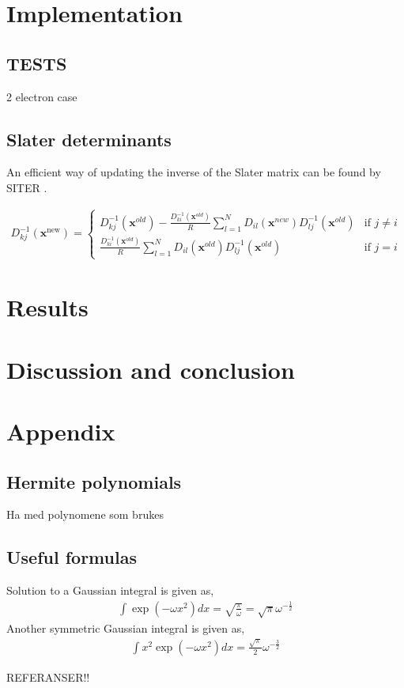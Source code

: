 \documentclass[11pt]{article}
\newcommand{\husk}[1]{\color{red} #1 \color{black}}
\begin{document}
\section{Implementation}

\subsection{TESTS}
\husk{2 electron case}

\subsection{Slater determinants}
An efficient way of updating the inverse of the Slater matrix can be found by \husk{SITER}. 

\begin{align}
D_{kj}^{-1}(\mathbf{x}^\text{new}) = \left\{
\begin{array}{ll}
	D_{kj}^{-1}(\mathbf{x}^{old}) - \frac{D_{ki}^{-1}(\mathbf{x}^{old})}{R}\sum^N_{l=1} D_{il}(\mathbf{x}^{new})D^{-1}_{lj}(\mathbf{x}^{old}) & \text{if } j\neq i \\
	\frac{D_{ki}^{-1}(\mathbf{x}^{old})}{R}\sum^N_{l=1} D_{il}(\mathbf{x}^{old})D^{-1}_{lj}(\mathbf{x}^{old}) & \text{if } j = i
\end{array}
\right.
\end{align}


\section{Results}



\section{Discussion and conclusion}



\section{Appendix}
\subsection{Hermite polynomials}
\husk{Ha med polynomene som brukes}

\subsection{Useful formulas}
Solution to a Gaussian integral is given as,
\begin{align}
	\int \exp\left( - \omega x^2 \right) d x = \sqrt{\frac{\pi}{\omega}} = \sqrt{\pi}\omega^{-\frac{1}{2}}
	\label{eq:gaussian-integral}
\end{align}
Another symmetric Gaussian integral is given as,
\begin{align}
	\int x^2 \exp\left( - \omega x^2 \right) d x = \frac{\sqrt{\pi}}{2}\omega^{-\frac{3}{2}}
	\label{eq:gaussian-integral-x-squared}
\end{align}

\husk{REFERANSER!!}
\end{document}
